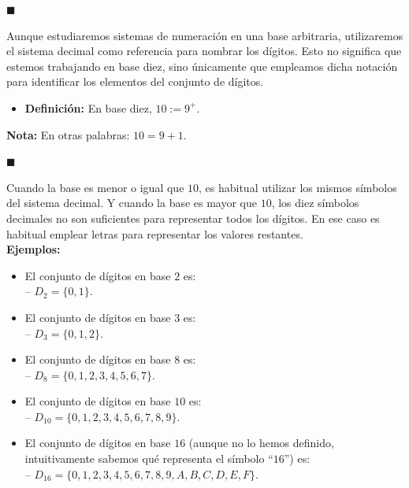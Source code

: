 \documentclass[10 pt]{article}
\begin{document}
\begin{flushright}
    $\blacksquare$
\end{flushright}

\Large{Aunque estudiaremos sistemas de numeración en una base arbitraria, utilizaremos el sistema decimal como referencia para nombrar los dígitos. Esto no significa que estemos trabajando en base diez, sino únicamente que empleamos dicha notación para identificar los elementos del conjunto de dígitos.} \\

\begin{itemize}
    \item \Large{\textbf{Definición:} En base diez, $10:=9^+$.} \\
\end{itemize}

\Large{\textbf{Nota:} En otras palabras: $10=9+1$.} \\

\begin{flushright}
    $\blacksquare$
\end{flushright}

\Large{Cuando la base es menor o igual que $10$, es habitual utilizar los mismos símbolos del sistema decimal. Y cuando la base es mayor que $10$, los diez símbolos decimales no son suficientes para representar todos los dígitos. En ese caso es habitual emplear letras para representar los valores restantes.} \\

\Large{\textbf{Ejemplos:}} \\

\begin{itemize}
    \item \Large{El conjunto de dígitos en base $2$ es: \\

    -- $D_2=\{0,1\}$.} \\

    \item \Large{El conjunto de dígitos en base $3$ es: \\

    -- $D_3=\{0,1,2\}$.} \\

    \item \Large{El conjunto de dígitos en base $8$ es: \\

    -- $D_8=\{0,1,2,3,4,5,6,7\}$.} \\

    \item \Large{El conjunto de dígitos en base $10$ es: \\

    -- $D_{10}=\{0,1,2,3,4,5,6,7,8,9\}$.} \\

    \item \Large{El conjunto de dígitos en base $16$ (aunque no lo hemos definido, intuitivamente sabemos qué representa el símbolo ``$16$'') es: \\

    -- $D_{16}=\{0,1,2,3,4,5,6,7,8,9,A,B,C,D,E,F\}$.} \\
\end{itemize}
\end{document}
